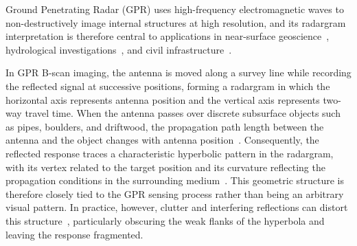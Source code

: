 \documentclass[lettersize,journal]{IEEEtran}
\begin{document}


\IEEEPARstart 
Ground Penetrating Radar (GPR) uses high-frequency electromagnetic waves to non-destructively image internal structures at high resolution, and its radargram interpretation is therefore central to applications in near-surface geoscience~\cite{10.2113/JEEG12.1.69,HARARI199643}, hydrological investigations~\cite{gomez,7236877}, and civil infrastructure~\cite{METJE2007568,9889189,Benedetto2017An,lai2018review}.

In GPR B-scan imaging, the antenna is moved along a survey line while recording the reflected signal at successive positions, forming a radargram in which the horizontal axis represents antenna position and the vertical axis represents two-way travel time. 
When the antenna passes over discrete subsurface objects such as pipes, boulders, and driftwood, the propagation path length between the antenna and the object changes with antenna position~\cite{Mertens2015Automated}.
Consequently, the reflected response traces a characteristic hyperbolic pattern in the radargram, with its vertex related to the target position and its curvature reflecting the propagation conditions in the surrounding medium~\cite{Shihab2005}. 
This geometric structure is therefore closely tied to the GPR sensing process rather than being an arbitrary visual pattern. 
In practice, however, clutter and interfering reflections can distort this structure~\cite{6656006,9777703}, particularly obscuring the weak flanks of the hyperbola and leaving the response fragmented.
\end{document}
